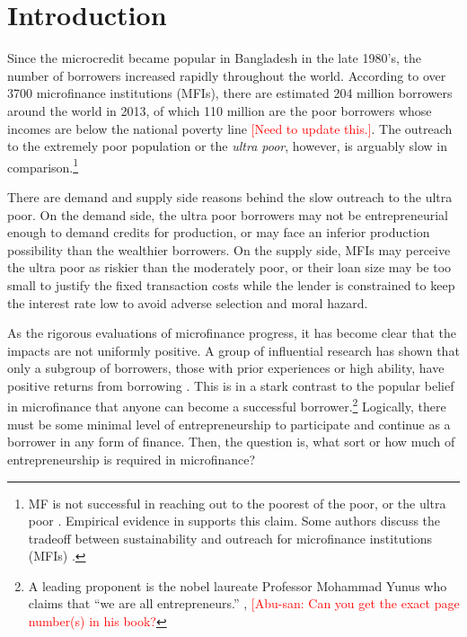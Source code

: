 \section{Introduction}
\label{SecIntroduction}


	Since the microcredit became popular in Bangladesh in the late 1980's, the number of borrowers increased rapidly throughout the world. According to over 3700 microfinance institutions (MFIs), there are estimated 204 million borrowers around the world in 2013, of which 110 million are the poor borrowers whose incomes are below the national poverty line \citep{MFGateway2015} \textcolor{red}{[Need to update this.]}. The outreach to the extremely poor population or the \textit{ultra poor}, however, is arguably slow in comparison.\footnote{MF is not successful in reaching out to the poorest of the poor, or the ultra poor \citep[][]{Scully2004}. Empirical evidence in \citet{Yaron1994, Navajas2000, RahmanRazzaque2000, AghionMorduch2007} supports this claim. Some authors discuss the tradeoff between sustainability and outreach for microfinance institutions (MFIs) \citet{HermesLensink2011, HermesLensinkMeesters2011, Cull2011}. } 

	There are demand and supply side reasons behind the slow outreach to the ultra poor. On the demand side, the ultra poor borrowers may not be entrepreneurial enough to demand credits for production, or may face an inferior production possibility than the wealthier borrowers. On the supply side, MFIs may perceive the ultra poor as riskier than the moderately poor, or their loan size may be too small to justify the fixed transaction costs while the lender is constrained to keep the interest rate low to avoid adverse selection and moral hazard. 

	As the rigorous evaluations of microfinance progress, it has become clear that the impacts are not uniformly positive. A group of influential research has shown that only a subgroup of borrowers, those with prior experiences or high ability, have positive returns from borrowing \citep{Banerjee2015Miracle, Mckenzie2017Spurring, Buera2017, Banerjee2019MFPovertyTrap}. This is in a stark contrast to the popular belief in microfinance that anyone can become a successful borrower.\footnote{A leading proponent is the nobel laureate Professor Mohammad Yunus who claims that ``we are all entrepreneurs.'' \citep{Yunus2003}, \citep{Cosic2017} \textcolor{red}{[Abu-san: Can you get the exact page number(s) in his book?} } Logically, there must be some minimal level of entrepreneurship to participate and continue as a borrower in any form of finance. Then, the question is, what sort or how much of entrepreneurship is required in microfinance? 
	
